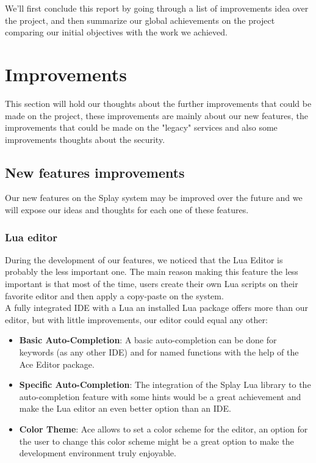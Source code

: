 \documentclass{eplmastersthesis}
\begin{document}
    We'll first conclude this report by going through a list of improvements
    idea over the project, and then summarize our global achievements on the
    project comparing our initial objectives with the work we achieved.

    \section{Improvements}

      This section will hold our thoughts about the further improvements
      that could be made on the project, these improvements are mainly about
      our new features, the improvements that could be made on the "legacy"
      services and also some improvements thoughts about the security.

      \subsection{New features improvements}

        Our new features on the Splay system may be improved over the future
        and we will expose our ideas and thoughts for each one of these
        features.

        \subsubsection{Lua editor}

        During the development of our features, we noticed that the Lua Editor
        is probably the less important one. The main reason making this feature
        the less important is that most of the time, users create their own Lua
        scripts on their favorite editor and then apply a copy-paste on the
        system.\\
        A fully integrated IDE with a Lua an installed Lua package offers more
        than our editor, but with little improvements, our editor could equal
        any other:

        \begin{itemize}
          \item \textbf{Basic Auto-Completion}: A basic auto-completion can be
          done for keywords (as any other IDE) and for named functions with
          the help of the Ace Editor package.
          \item \textbf{Specific Auto-Completion}: The integration of the Splay
          Lua library to the auto-completion feature with some hints would
          be a great achievement and make the Lua editor an even better
          option than an IDE.
          \item \textbf{Color Theme}: Ace allows to set a color scheme for
          the editor, an option for the user to change this color scheme
          might be a great option to make the development environment
          truly enjoyable.
        \end{itemize}
\end{document}
